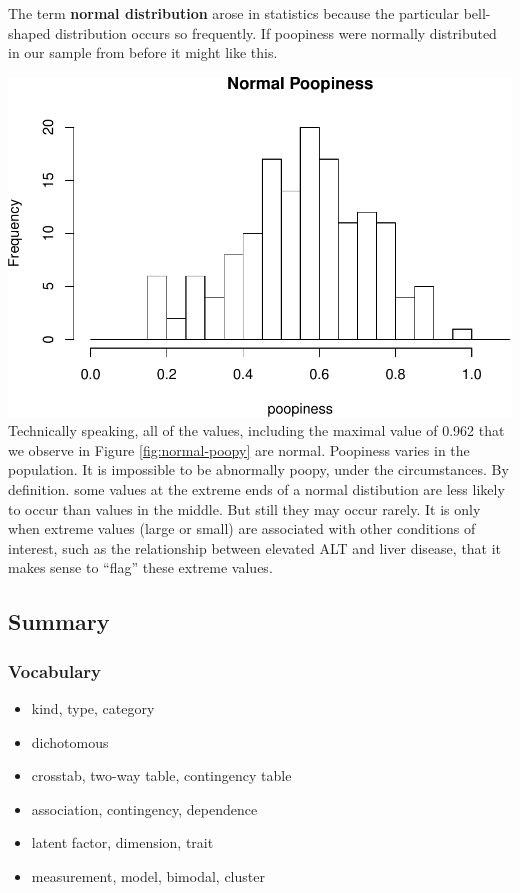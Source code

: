 \documentclass[]{book}
\providecommand{\tightlist}{%
  \setlength{\itemsep}{0pt}\setlength{\parskip}{0pt}}
\begin{document}
The term \textbf{normal distribution} arose in statistics because the particular bell-shaped distribution occurs so frequently. If poopiness were normally distributed in our sample from before it might like this.

\includegraphics{bigquestions-book_files/figure-latex/normal-poopy-1.pdf}
Technically speaking, all of the values, including the maximal value of 0.962 that we observe in Figure \ref{fig:normal-poopy} are normal. Poopiness varies in the population. It is impossible to be abnormally poopy, under the circumstances. By definition. some values at the extreme ends of a normal distibution are less likely to occur than values in the middle. But still they may occur rarely. It is only when extreme values (large or small) are associated with other conditions of interest, such as the relationship between elevated ALT and liver disease, that it makes sense to ``flag'' these extreme values.

\hypertarget{summary}{%
\subsection*{Summary}\label{summary}}

\hypertarget{vocabulary}{%
\subsubsection*{Vocabulary}\label{vocabulary}}

\begin{itemize}
\tightlist
\item
  kind, type, category
\item
  dichotomous
\item
  crosstab, two-way table, contingency table
\item
  association, contingency, dependence
\item
  latent factor, dimension, trait
\item
  measurement, model, bimodal, cluster
\end{itemize}
\end{document}
